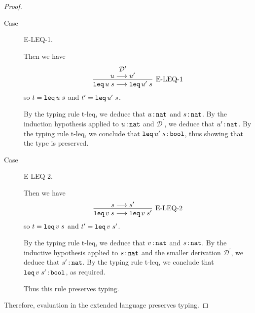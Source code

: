 \documentclass[11pt,letterpaper]{article}
\begin{document}
\begin{proof}
\begin{description}
        \item[Case] E-LEQ-1.

            Then we have
            \begin{equation*}
                \infer[\text{E-LEQ-1}]{
                    \Leq{u}{s}
                    \evalto
                    \Leq{u^\prime}{s}
                }{
                    \deduce[\mathcal{D}^\prime]{u \evalto u^\prime}{}
                }
            \end{equation*}
            so $t = \operatorname{\mathtt{leq}} u \; s$ and $t^\prime = \operatorname{\mathtt{leq}} u^\prime \; s$.

            By the typing rule t-leq, we deduce that $u \operatorname{:} \mathtt{nat}$
            and $s \operatorname{:} \mathtt{nat}$.
            By the induction hypothesis applied to $u \operatorname{:} \mathtt{nat}$
            and $\mathcal{D}^\prime$,
            we deduce that $u^\prime \operatorname{:} \mathtt{nat}$.
            By the typing rule t-leq, we conclude that
            $\operatorname{\mathtt{leq}} u^\prime \; s \operatorname{:} \mathtt{bool}$, thus showing that the
            type is preserved.

        \item[Case] E-LEQ-2.

            Then we have
            \begin{equation*}
                \infer[\text{E-LEQ-2}]{
                    \Leq{v}{s}
                    \evalto
                    \Leq{v}{s^\prime}
                }{
                    s \evalto s^\prime
                }
            \end{equation*}
            so $t = \operatorname{\mathtt{leq}} v \; s$ and $t^\prime = \operatorname{\mathtt{leq}} v \; s^\prime$.

            By the typing rule t-leq, we deduce that $v \operatorname{:} \mathtt{nat}$
            and $s \operatorname{:} \mathtt{nat}$.
            By the inductive hypothesis applied to $s \operatorname{:} \mathtt{nat}$
            and the smaller derivation $\mathcal{D}^\prime$, we deduce that
            $s^\prime \operatorname{:} \mathtt{nat}$.
            By the typing rule t-leq, we conclude that
            $\operatorname{\mathtt{leq}} v \; s^\prime \operatorname{:} \mathtt{bool}$, as required.

            Thus this rule preserves typing.
    \end{description}

    Therefore, evaluation in the extended language preserves typing.
\end{proof}
\end{document}
